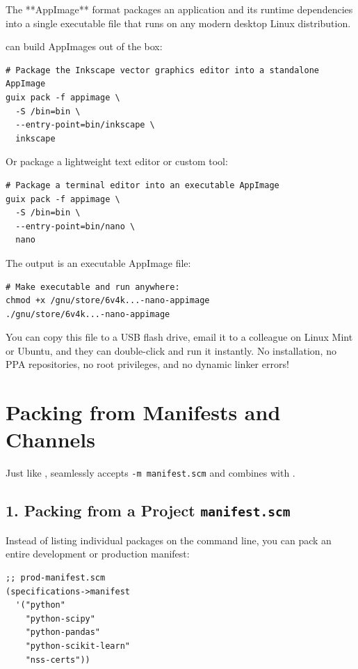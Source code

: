 The **AppImage** format packages an application and its runtime dependencies into a single executable file that runs on any modern desktop Linux distribution.

 can build AppImages out of the box:

\begin{lstlisting}[style=guixcli]
# Package the Inkscape vector graphics editor into a standalone AppImage
guix pack -f appimage \
  -S /bin=bin \
  --entry-point=bin/inkscape \
  inkscape
\end{lstlisting}

Or package a lightweight text editor or custom tool:

\begin{lstlisting}[style=guixcli]
# Package a terminal editor into an executable AppImage
guix pack -f appimage \
  -S /bin=bin \
  --entry-point=bin/nano \
  nano
\end{lstlisting}

The output is an executable AppImage file:
\begin{lstlisting}[style=guixcli]
# Make executable and run anywhere:
chmod +x /gnu/store/6v4k...-nano-appimage
./gnu/store/6v4k...-nano-appimage
\end{lstlisting}

You can copy this file to a USB flash drive, email it to a colleague on Linux Mint or Ubuntu, and they can double-click and run it instantly. No installation, no PPA repositories, no root privileges, and no dynamic linker errors!

\section{Packing from Manifests and Channels}

Just like ,  seamlessly accepts \texttt{-m manifest.scm} and combines with .

\subsection{1. Packing from a Project \texttt{manifest.scm}}

Instead of listing individual packages on the command line, you can pack an entire development or production manifest:

\begin{lstlisting}[style=guixscheme]
;; prod-manifest.scm
(specifications->manifest
  '("python"
    "python-scipy"
    "python-pandas"
    "python-scikit-learn"
    "nss-certs"))
\end{lstlisting}

